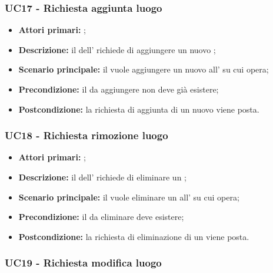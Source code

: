 \documentclass[../analisi-dei-requisiti]{subfiles}
\begin{document}
\subsubsection{UC17 - Richiesta aggiunta luogo}
\label{subsub:UC17}

\begin{itemize}
  \item \textbf{Attori primari:} ;
  \item \textbf{Descrizione:} il  dell' richiede di aggiungere un nuovo ;
  \item \textbf{Scenario principale:} il  vuole aggiungere un nuovo  all' su cui opera;
  \item \textbf{Precondizione:} il  da aggiungere non deve già esistere;
  \item \textbf{Postcondizione:} la richiesta di aggiunta di un nuovo  viene posta.

\end{itemize}

\subsubsection{UC18 - Richiesta rimozione luogo}
\label{subsub:UC18}

\begin{itemize}
  \item \textbf{Attori primari:} ;
  \item \textbf{Descrizione:} il  dell' richiede di eliminare un ;
  \item \textbf{Scenario principale:} il  vuole eliminare un  all' su cui opera;
  \item \textbf{Precondizione:} il  da eliminare deve esistere;
  \item \textbf{Postcondizione:} la richiesta di eliminazione di un  viene posta.

\end{itemize}

\subsubsection{UC19 - Richiesta modifica luogo}
\label{subsub:UC19}
\end{document}

